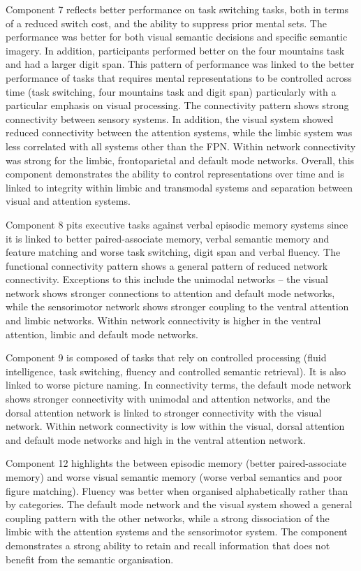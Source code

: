 Component 7 reflects better performance on task switching tasks, both in terms of a reduced switch cost, and the ability to suppress prior mental sets. The performance was better for both visual semantic decisions and specific semantic imagery. In addition, participants performed better on the four mountains task and had a larger digit span. This pattern of performance was linked to the better performance of tasks that requires mental representations to be controlled across time (task switching, four mountains task and digit span) particularly with a particular emphasis on visual processing. The connectivity pattern shows strong connectivity between sensory systems. In addition, the visual system showed reduced connectivity between the attention systems, while the limbic system was less correlated with all systems other than the FPN. Within network connectivity was strong for the limbic, frontoparietal and default mode networks. Overall, this component demonstrates the ability to control representations over time and is linked to integrity within limbic and transmodal systems and separation between visual and attention systems.

Component 8 pits executive tasks against verbal episodic memory systems since it is linked to better paired-associate memory, verbal semantic memory and feature matching and worse task switching, digit span and verbal fluency. The functional connectivity pattern shows a general pattern of reduced network connectivity.  Exceptions to this include the unimodal networks – the visual network shows stronger connections to attention and default mode networks, while the sensorimotor network shows stronger coupling to the ventral attention and limbic networks. Within network connectivity is higher in the ventral attention, limbic and default mode networks. 

Component 9 is composed of tasks that rely on controlled processing (fluid intelligence, task switching, fluency and controlled semantic retrieval). It is also linked to worse picture naming. In connectivity terms, the default mode network shows stronger connectivity with unimodal and attention networks, and the dorsal attention network is linked to stronger connectivity with the visual network. Within network connectivity is low within the visual, dorsal attention and default mode networks and high in the ventral attention network. 

Component 12 highlights the between episodic memory (better paired-associate memory) and worse visual semantic memory (worse verbal semantics and poor figure matching). Fluency was better when organised alphabetically rather than by categories. The default mode network and the visual system showed a general coupling pattern with the other networks, while a strong dissociation of the limbic with the attention systems and the sensorimotor system. The component demonstrates a strong ability to retain and recall information that does not benefit from the semantic organisation.

